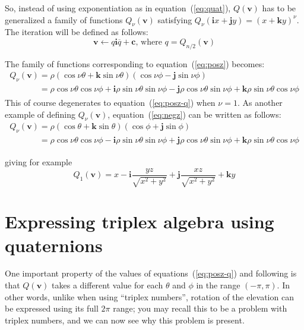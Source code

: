 \documentclass{article}
\let\vec\mathbf
\let\bar\overline
\newcommand{\mathnewline}[1][\quad]{\\\phantom{#1}}
\newcommand{\where}{\text{, where }}
\begin{document}
So, instead of using exponentiation as in equation~(\ref{eq:quat}),
$Q(\vec{v})$ has to be generalized a family of functions
$Q_\nu(\vec{v})$ satisfying $Q_\nu(\vec{i}x+\vec{j}y) =
(x+\vec{k}y)^\nu$.  The iteration will be defined as follows:
\begin{equation*}
\vec{v}\leftarrow q\vec{i}\bar q+\vec{c} \where q=Q_{n/2}(\vec{v})
\end{equation*}

\noindent
The family of functions corresponding to equation~(\ref{eq:posz})
becomes:
\begin{equation*}
  \begin{array}{l}
  Q_\nu(\vec{v}) = \rho (\cos \nu\theta + \vec{k} \sin \nu\theta) (\cos \nu\phi - \vec{j} \sin \nu\phi)
  \mathnewline[Q_\nu(\vec{v})] = \rho \cos \nu\theta \cos \nu\phi + \vec{i} \rho \sin \nu\theta \sin \nu\phi - \vec{j} \rho \cos \nu\theta \sin \nu\phi + \vec{k} \rho \sin \nu\theta \cos \nu\phi
  \end{array}
\end{equation*}
\noindent
This of course degenerates to equation~(\ref{eq:posz-q}) when
$\nu=1$. As another example of defining $Q_\nu(\vec{v})$,
equation~(\ref{eq:negz}) can be written as follows:
\begin{equation*}
  \label{eq:negz-q}
  \begin{array}{l}
  Q_\nu(\vec{v}) = \rho (\cos \theta + \vec{k} \sin \theta) (\cos \phi + \vec{j} \sin \phi)
  \mathnewline[Q_\nu(\vec{v})] = \rho \cos \nu\theta \cos \nu\phi - \vec{i} \rho \sin \nu\theta \sin \nu\phi + \vec{j} \rho \cos \nu\theta \sin \nu\phi + \vec{k} \rho \sin \nu\theta \cos \nu\phi
  \end{array}
\end{equation*}
 
\noindent
giving for example
\begin{equation*}
  Q_1(\vec{v}) = x - \vec{i}\frac{y z}{\sqrt{x^2 + y^2}} + \vec{j}\frac{x z}{\sqrt{x^2 + y^2}} + \vec{k} y
\end{equation*}

\section{Expressing triplex algebra using quaternions}
\label{sec:quatplex}

One important property of the values of equations~(\ref{eq:posz-q})
and following is that $Q(\vec{v})$ takes a different value for each
$\theta$ and $\phi$ in the range $(-\pi, \pi)$.  In other words,
unlike when using ``triplex numbers'', rotation of the elevation can
be expressed using its full $2\pi$ range; you may recall this to be a
problem with triplex numbers, and we can now see why this problem is
present.
\end{document}
